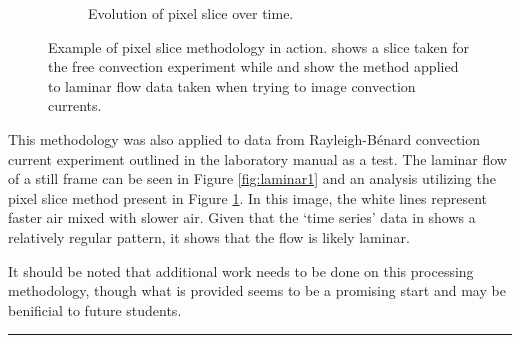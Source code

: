 \documentclass[aip, cp, amsmath, amssymb, reprint, nofootinbib]{revtex4-2}
\newcommand\advname{B. Braverman\space} %
\newcommand\taname{A. Sloan\space} %
\newcommand\lponename{Jack Wang\space}
\newcommand\lptwoname{Yiheng Wang\space}
\newcommand\lpthreename{Kai Lyu\space}
\begin{document}
\begin{figure}[H]
\begin{subfigure}[b]{0.33\linewidth}
                \caption{Evolution of pixel slice over time.}
                \label{fig:laminar2}
            \end{subfigure}
            \caption{Example of pixel slice methodology in action.  shows a slice taken for the free convection experiment while  and  show the method applied to laminar flow data taken when trying to image convection currents.}
            \label{fig:laminar}
        \end{figure}

        This methodology was also applied to data from Rayleigh-B{\'e}nard convection current experiment outlined in the laboratory manual\cite{manual} as a test. The laminar flow of a still frame can be seen in Figure \ref{fig:laminar1} and an analysis utilizing the pixel slice method present in Figure \ref{fig:laminar2}. In this image, the white lines represent faster air mixed with slower air. Given that the `time series' data in  shows a relatively regular pattern, it shows that the flow is likely laminar. 

        It should be noted that additional work needs to be done on this processing methodology, though what is provided seems to be a promising start and may be benificial to future students.

    \onecolumngrid
    \begin{center}
        \vspace{0.8cm}
        \noindent\rule{0.9\textwidth}{0.5pt}
    \end{center}




\end{document}
